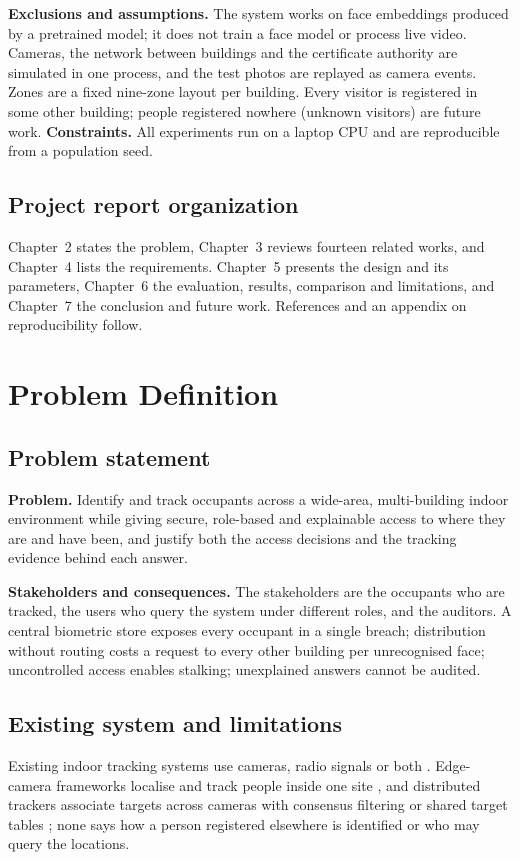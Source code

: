 \documentclass[12pt,a4paper,oneside]{report}
\begin{document}
\textbf{Exclusions and assumptions.} The system works on face embeddings produced by a pretrained model; it does not train a face model or process live video. Cameras, the network between buildings and the certificate authority are simulated in one process, and the test photos are replayed as camera events. Zones are a fixed nine-zone layout per building. Every visitor is registered in some other building; people registered nowhere (unknown visitors) are future work. \textbf{Constraints.} All experiments run on a laptop CPU and are reproducible from a population seed.

\section{Project report organization}
Chapter~2 states the problem, Chapter~3 reviews fourteen related works, and Chapter~4 lists the requirements. Chapter~5 presents the design and its parameters, Chapter~6 the evaluation, results, comparison and limitations, and Chapter~7 the conclusion and future work. References and an appendix on reproducibility follow.

\clearpage
\chapter{Problem Definition}
\section{Problem statement}
\textbf{Problem.} Identify and track occupants across a wide-area, multi-building indoor environment while giving secure, role-based and explainable access to where they are and have been, and justify both the access decisions and the tracking evidence behind each answer.

\textbf{Stakeholders and consequences.} The stakeholders are the occupants who are tracked, the users who query the system under different roles, and the auditors. A central biometric store exposes every occupant in a single breach; distribution without routing costs a request to every other building per unrecognised face; uncontrolled access enables stalking; unexplained answers cannot be audited.





\section{Existing system and limitations}
Existing indoor tracking systems use cameras, radio signals or both \cite{ref1,ref2,ref9}. Edge-camera frameworks localise and track people inside one site \cite{ref1,ref2,ref5}, and distributed trackers associate targets across cameras with consensus filtering or shared target tables \cite{ref3,ref4}; none says how a person registered elsewhere is identified or who may query the locations.
\end{document}
